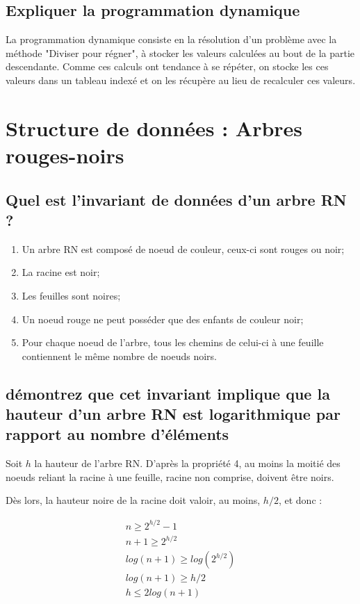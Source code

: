 \documentclass[11pt]{article}
\begin{document}
\subsection{Expliquer la programmation dynamique}

La programmation dynamique consiste en la résolution d’un problème avec la méthode "Diviser pour régner", à stocker les valeurs calculées au bout de la partie descendante. Comme ces calculs ont tendance à se répéter, on stocke les ces valeurs dans un tableau indexé et on les récupère au lieu de recalculer ces valeurs.

\section{Structure de données : Arbres rouges-noirs}

\subsection{Quel est l'invariant de données d'un arbre RN ?}

\begin{enumerate}
	\item Un arbre RN est composé de noeud de couleur, ceux-ci sont rouges ou noir;
	\item La racine est noir;
	\item Les feuilles sont noires;
	\item Un noeud rouge ne peut posséder que des enfants de couleur noir;
	\item Pour chaque noeud de l'arbre, tous les chemins de celui-ci à une feuille contiennent le même nombre de noeuds noirs. 
\end{enumerate}

\subsection{démontrez que cet invariant implique que la hauteur d'un arbre RN est logarithmique par rapport au nombre d'éléments}

Soit $h$ la hauteur de l'arbre RN. D'après la propriété 4, au moins la moitié des noeuds reliant la racine à une feuille, racine non comprise, doivent être noirs.

Dès lors, la hauteur noire de la racine doit valoir, au moins, $h/2$, et donc :

\begin{equation}
	\begin{split}
		n \geq 2^{h/2} - 1\\
		n + 1 \geq 2^{h/2}\\
		log(n + 1) \geq log(2^{h/2})\\
		log(n + 1) \geq h/2\\
		h \leq 2 log(n + 1) 
	\end{split}
\end{equation}
\end{document}

